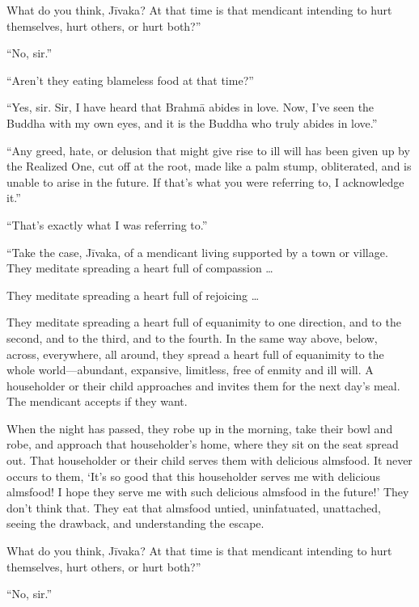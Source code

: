 \documentclass[12pt,openany]{book}%
\begin{document}
What do you think, \textsanskrit{Jīvaka}? At that time is that mendicant intending to hurt themselves, hurt others, or hurt both?” 

“No, sir.” 

“Aren’t they eating blameless food at that time?” 

“Yes, sir. Sir, I have heard that \textsanskrit{Brahmā} abides in love. Now, I’ve seen the Buddha with my own eyes, and it is the Buddha who truly abides in love.” 

“Any greed, hate, or delusion that might give rise to ill will has been given up by the Realized One, cut off at the root, made like a palm stump, obliterated, and is unable to arise in the future. If that’s what you were referring to, I acknowledge it.” 

“That’s exactly what I was referring to.” 

“Take the case, \textsanskrit{Jīvaka}, of a mendicant living supported by a town or village. They meditate spreading a heart full of compassion … 

They meditate spreading a heart full of rejoicing … 

They meditate spreading a heart full of equanimity to one direction, and to the second, and to the third, and to the fourth. In the same way above, below, across, everywhere, all around, they spread a heart full of equanimity to the whole world—abundant, expansive, limitless, free of enmity and ill will. A householder or their child approaches and invites them for the next day’s meal. The mendicant accepts if they want. 

When the night has passed, they robe up in the morning, take their bowl and robe, and approach that householder’s home, where they sit on the seat spread out. That householder or their child serves them with delicious almsfood. It never occurs to them, ‘It’s so good that this householder serves me with delicious almsfood! I hope they serve me with such delicious almsfood in the future!’ They don’t think that. They eat that almsfood untied, uninfatuated, unattached, seeing the drawback, and understanding the escape. 

What do you think, \textsanskrit{Jīvaka}? At that time is that mendicant intending to hurt themselves, hurt others, or hurt both?” 

“No, sir.” 
\end{document}
